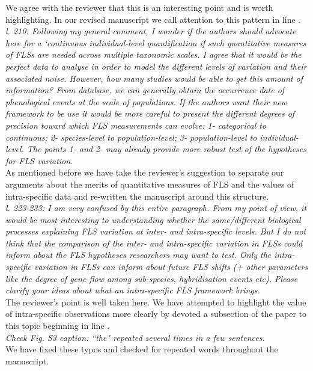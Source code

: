\documentclass{article}[11pt]
\begin{document}
\noident We agree with the reviewer that this is an interesting point and is worth highlighting. In our revised manuscript we call attention to this pattern in line .\\

\emph{l. 210: Following my general comment, I wonder if the authors should advocate here for a `continuous individual-level quantification if such quantitative measures of FLSs are needed across multiple taxonomic scales. I agree that it would be the perfect data to analyse in order to model the different levels of variation and their associated noise. However, how many studies would be able to get this amount of information? From database, we can generally obtain the occurrence date of phenological events at the scale of populations. If the authors want their new framework to be use it would be more careful to present the different degrees of precision toward which FLS measurements can evolve: 1- categorical to continuous; 2- species-level to population-level; 3- population-level to individual-level. The points 1- and 2- may already provide more robust test of the hypotheses for FLS variation.}\\ %

\noindent As mentioned before we have take the reviewer's suggestion to separate our arguments about the merits of quantitative measures of FLS and the values of intra-specific data and re-written the manuscript around this structure.\\


\emph{l. 223-233: I am very confused by this entire paragraph. From my point of view, it would be most interesting to understanding whether the same/different biological processes explaining FLS variation at inter- and intra-specific levels. But I do not think that the comparison of the inter- and intra-specific variation in FLSs could inform about the FLS hypotheses researchers may want to test. Only the intra-specific variation in FLSs can inform about future FLS shifts (+ other parameters like the degree of gene flow among sub-species, hybridisation events etc). Please clarify your ideas about what an intra-specific FLS framework brings.}\\

\noindent The reviewer's point is well taken here. We have attempted to highlight the value of intra-specific observations more clearly by devoted a subsection of the paper to this topic beginning in line .\\

\emph{Check Fig. S3 caption: ``the" repeated several times in a few sentences.}\\

\noindent We have fixed these typos and checked for repeated words throughout the manuscript.\\

\clearpage


\end{document}
